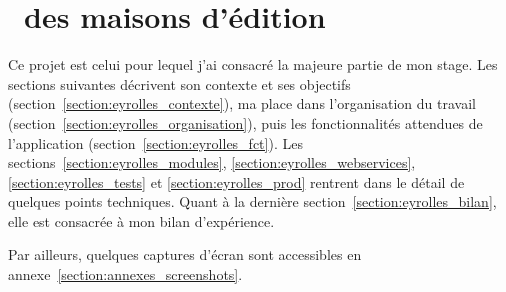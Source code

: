 \section{\aintranet\ des maisons d'édition \aey}
\label{eyrolles}

Ce projet est celui pour lequel j'ai consacré la majeure partie de mon stage. Les sections suivantes décrivent son contexte et ses objectifs (section~\ref{section:eyrolles_contexte}), ma place dans l'organisation du travail (section~\ref{section:eyrolles_organisation}), puis les fonctionnalités attendues de l'application (section~\ref{section:eyrolles_fct}). Les sections~\ref{section:eyrolles_modules}, \ref{section:eyrolles_webservices}, \ref{section:eyrolles_tests} et \ref{section:eyrolles_prod} rentrent dans le détail de quelques points techniques. Quant à la dernière section~\ref{section:eyrolles_bilan}, elle est consacrée à mon bilan d'expérience.

Par ailleurs, quelques captures d'écran sont accessibles en annexe~\ref{section:annexes_screenshots}.

















